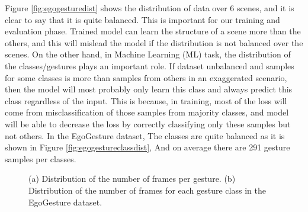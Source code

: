 Figure \ref{fig:egogesturedist} shows the distribution of data over 6 scenes, and it is clear to say that it is quite balanced.  This is important for our training and evaluation phase.  Trained model can learn the structure of a scene more than the others, and this will mislead the model if the distribution is not balanced over the scenes.  On the other hand,  in Machine Learning (ML) task, the distribution of the classes/gestures plays an important role\cite{wei_role_2013}.  If dataset unbalanced and samples for some classes is more than samples from others in an exaggerated scenario, then the model will most probably only learn this class and always predict this class regardless of the input.   This is because,  in training, most of the loss will come from misclassification of those samples from majority classes, and model will be able to decrease the loss by correctly classifying only these samples but not others.   In the EgoGesture dataset, The classes are quite balanced as it is shown in Figure \ref{fig:egogestureclassdist}, And on average there are 291 gesture samples per classes.\\
\begin{figure}[h]%
\centering
{}%
\label{fig:framedist1}%
\qquad
{}%
\caption{(a) Distribution of the number of frames per gesture. 
(b) Distribution of the number of frames for each gesture class in the EgoGesture dataset. }
\label{fig:egogestureframeall}
\end{figure}


